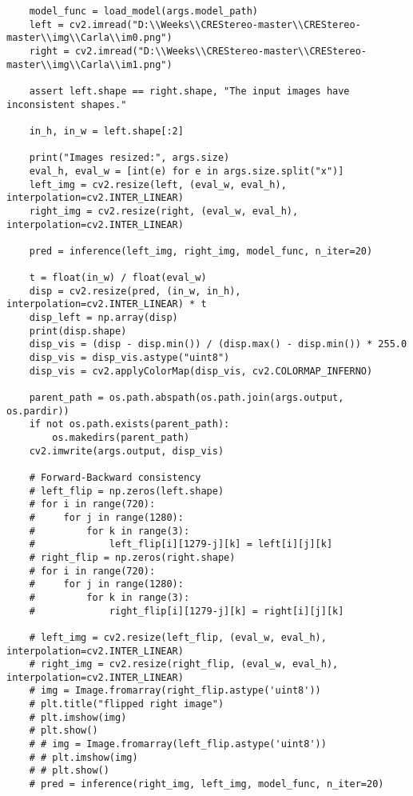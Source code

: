 \begin{lstlisting}
    model_func = load_model(args.model_path)
    left = cv2.imread("D:\\Weeks\\CREStereo-master\\CREStereo-master\\img\\Carla\\im0.png")
    right = cv2.imread("D:\\Weeks\\CREStereo-master\\CREStereo-master\\img\\Carla\\im1.png")

    assert left.shape == right.shape, "The input images have inconsistent shapes."

    in_h, in_w = left.shape[:2]

    print("Images resized:", args.size)
    eval_h, eval_w = [int(e) for e in args.size.split("x")]
    left_img = cv2.resize(left, (eval_w, eval_h), interpolation=cv2.INTER_LINEAR)
    right_img = cv2.resize(right, (eval_w, eval_h), interpolation=cv2.INTER_LINEAR)

    pred = inference(left_img, right_img, model_func, n_iter=20)

    t = float(in_w) / float(eval_w)
    disp = cv2.resize(pred, (in_w, in_h), interpolation=cv2.INTER_LINEAR) * t
    disp_left = np.array(disp)
    print(disp.shape)
    disp_vis = (disp - disp.min()) / (disp.max() - disp.min()) * 255.0
    disp_vis = disp_vis.astype("uint8")
    disp_vis = cv2.applyColorMap(disp_vis, cv2.COLORMAP_INFERNO)

    parent_path = os.path.abspath(os.path.join(args.output, os.pardir))
    if not os.path.exists(parent_path):
        os.makedirs(parent_path)
    cv2.imwrite(args.output, disp_vis)

    # Forward-Backward consistency
    # left_flip = np.zeros(left.shape)
    # for i in range(720):
    #     for j in range(1280):
    #         for k in range(3):
    #             left_flip[i][1279-j][k] = left[i][j][k]
    # right_flip = np.zeros(right.shape)
    # for i in range(720):
    #     for j in range(1280):
    #         for k in range(3):
    #             right_flip[i][1279-j][k] = right[i][j][k]

    # left_img = cv2.resize(left_flip, (eval_w, eval_h), interpolation=cv2.INTER_LINEAR)
    # right_img = cv2.resize(right_flip, (eval_w, eval_h), interpolation=cv2.INTER_LINEAR)
    # img = Image.fromarray(right_flip.astype('uint8'))
    # plt.title("flipped right image")
    # plt.imshow(img)
    # plt.show()
    # # img = Image.fromarray(left_flip.astype('uint8'))
    # # plt.imshow(img)
    # # plt.show()
    # pred = inference(right_img, left_img, model_func, n_iter=20)


\end{lstlisting}
